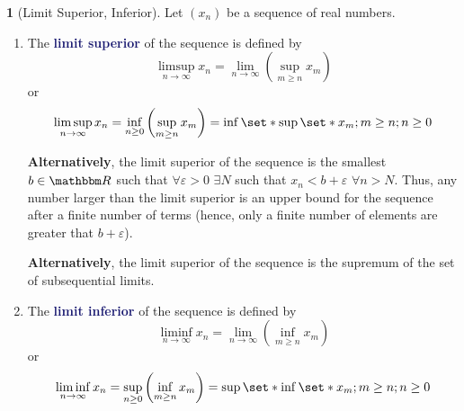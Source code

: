 \documentclass[12pt]{article}
\numberwithin{equation}{section}
\newcommand{\navy}[1]{\textcolor{MidnightBlue}{\bf #1}}
\theoremstyle{plain}
\theoremstyle{definition}
\newtheorem{definition}{\color{MidnightBlue}{\textbf{Definition}}}[section]
\newcommand\parens[1]{\left( #1 \right)}
\def\Set{\set*}%
\newcommand{\1}{\mathbbm 1}
\newcommand{\e}{\varepsilon}
\newcommand{\RR}{\mathbbm R}
\begin{document}
\begin{definition}[Limit Superior, Inferior]
	Let $\parens{x_n}$ be a sequence of real numbers.

	\begin{enumerate}
		\item The \navy{limit superior} of the sequence is defined by
			\begin{equation}
				\limsup\limits_{n \to \infty} x_n = \lim_{n \to \infty}\parens{\sup_{m \geq n} x_m}
			\end{equation}
			or
			\begin{equation}
				\limsup\limits_{n \to \infty} x_n = \inf_{n \geq 0} \parens{\sup_{m \geq n} x_m} = \inf\Set{\sup \Set{x_m; m \geq n}; n \geq 0}
			\end{equation}

			\textbf{Alternatively}, the limit superior of the sequence is the smallest $b \in \RR$ such that $\forall \e > 0$ $\exists N$ such that $x_n < b + \e$ $\forall n > N$. Thus, any number larger than the limit superior is an upper bound for the sequence after a finite number of terms (hence, only a finite number of elements are greater that $b + \e$).

			\textbf{Alternatively}, the limit superior of the sequence is the supremum of the set of subsequential limits. 

		\item The \navy{limit inferior} of the sequence is defined by
			\begin{equation}
				\liminf\limits_{n \to \infty} x_n = \lim_{n \to \infty}\parens{\inf_{m \geq n} x_m}
			\end{equation}
			or
			\begin{equation}
				\liminf\limits_{n \to \infty} x_n = \sup_{n \geq 0} \parens{\inf_{m \geq n} x_m} = \sup\Set{\inf \Set{x_m; m \geq n}; n \geq 0}
			\end{equation}	
	\end{enumerate}

\end{definition}
\end{document}
